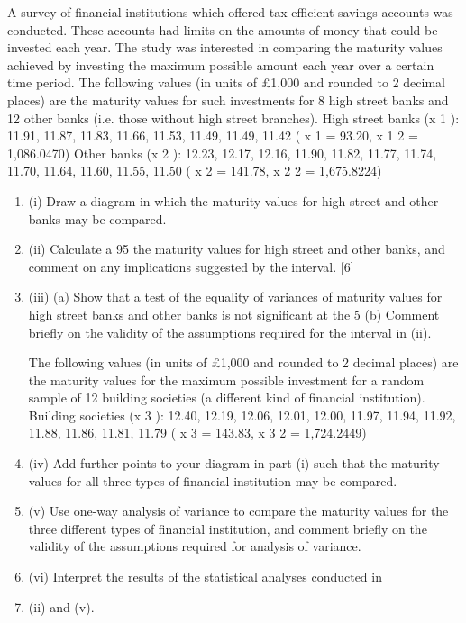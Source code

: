 \documentclass[a4paper,12pt]{article}
\begin{document}
\item 
A survey of financial institutions which offered tax-efficient savings accounts was
conducted. These accounts had limits on the amounts of money that could be
invested each year. The study was interested in comparing the maturity values
achieved by investing the maximum possible amount each year over a certain time
period.
The following values (in units of £1,000 and rounded to 2 decimal places) are the
maturity values for such investments for 8 high street banks and 12 other banks (i.e.
those without high street branches).
High street banks (x 1 ): 11.91, 11.87, 11.83, 11.66, 11.53, 11.49, 11.49, 11.42
( x 1 = 93.20, x 1 2 = 1,086.0470)
Other banks (x 2 ): 12.23, 12.17, 12.16, 11.90, 11.82, 11.77, 11.74, 11.70, 11.64, 11.60,
11.55, 11.50
( x 2 = 141.78, x 2 2 = 1,675.8224)
\begin{enumerate}
\item (i) Draw a diagram in which the maturity values for high street and other banks
may be compared.

\item (ii) Calculate a 95%
the maturity values for high street and other banks, and comment on any
implications suggested by the interval.
[6]
\item (iii) (a)
Show that a test of the equality of variances of maturity values for high
street banks and other banks is not significant at the 5%
(b)
Comment briefly on the validity of the assumptions required for the
interval in (ii).


The following values (in units of £1,000 and rounded to 2 decimal places) are the
maturity values for the maximum possible investment for a random sample of 12
building societies (a different kind of financial institution).
Building societies (x 3 ): 12.40, 12.19, 12.06, 12.01, 12.00, 11.97, 11.94, 11.92, 11.88,
11.86, 11.81, 11.79
( x 3 = 143.83, x 3 2 = 1,724.2449)

\item
(iv) Add further points to your diagram in part (i) such that the maturity values for
all three types of financial institution may be compared.

\item 
(v) Use one-way analysis of variance to compare the maturity values for the three
different types of financial institution, and comment briefly on the validity of
the assumptions required for analysis of variance.
\item 
(vi) Interpret the results of the statistical analyses conducted in \item (ii) and (v).
\end{enumerate}
\end{document}
